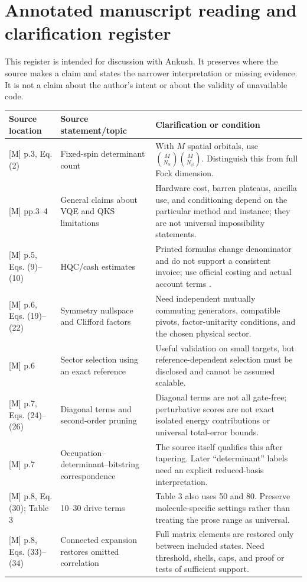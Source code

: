 \documentclass[11pt,a4paper,oneside]{report}
\begin{document}
\chapter{Annotated manuscript reading and clarification register}\label{app:audit}
This register is intended for discussion with Ankush. It preserves where the source makes a claim and states the narrower interpretation or missing evidence. It is not a claim about the author's intent or about the validity of unavailable code.

\begin{longtable}{@{}p{27mm}p{48mm}p{75mm}@{}}
\toprule Source location & Source statement/topic & Clarification or condition\\\midrule\endhead
{[M]} p.3, Eq. (2) & Fixed-spin determinant count & With $M$ spatial orbitals, use $\binom{M}{N_\alpha}\binom{M}{N_\beta}$. Distinguish this from full Fock dimension.\\
{[M]} pp.3--4 & General claims about VQE and QKS limitations & Hardware cost, barren plateaus, ancilla use, and conditioning depend on the particular method and instance; they are not universal impossibility statements.\\
{[M]} p.5, Eqs. (9)--(10) & HQC/cash estimates & Printed formulas change denominator and do not support a consistent invoice; use official costing and actual account terms \cite{hqc}.\\
{[M]} p.6, Eqs. (19)--(22) & Symmetry nullspace and Clifford factors & Need independent mutually commuting generators, compatible pivots, factor-unitarity conditions, and the chosen physical sector.\\
{[M]} p.6 & Sector selection using an exact reference & Useful validation on small targets, but reference-dependent selection must be disclosed and cannot be assumed scalable.\\
{[M]} p.7, Eqs. (24)--(26) & Diagonal terms and second-order pruning & Diagonal terms are not all gate-free; perturbative scores are not exact isolated energy contributions or universal total-error bounds.\\
{[M]} p.7 & Occupation--determinant--bitstring correspondence & The source itself qualifies this after tapering. Later ``determinant'' labels need an explicit reduced-basis interpretation.\\
{[M]} p.8, Eq. (30); Table 3 & 10--30 drive terms & Table 3 also uses 50 and 80. Preserve molecule-specific settings rather than treating the prose range as universal.\\
{[M]} p.8, Eqs. (33)--(34) & Connected expansion restores omitted correlation & Full matrix elements are restored only between included states. Need threshold, shells, caps, and proof or tests of sufficient support.\\

\end{longtable}
\end{document}
